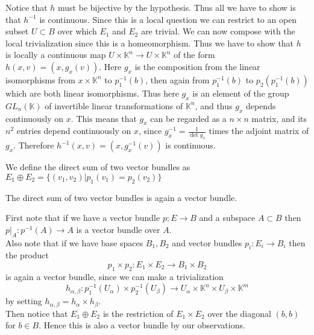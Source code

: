 \documentclass[../Thesis.tex]{subfiles}
\begin{document}
\begin{myproof}
Notice that $h$ must be bijective by the hypothesis. Thus all we have to show is that $h^{-1}$ is continuous. Since this is a local question we can restrict to an open subset $U \subset B$ over which $E_1$ and $E_2$ are trivial. We can now compose with the local trivialization since this is a homeomorphism. Thus we have to show that $h$ is locally a continuous map $U \times \mathbb{K}^n \rightarrow U \times \mathbb{K}^n$ of the form $h(x,v) = (x, g_x(v))$. Here $g_x$ is the composition from the linear isomorphisms from $x \times \mathbb{K}^n$ to $p_1^{-1}(b)$, then again from $p_1^{-1}(b)$ to $p_2(p_1^{-1}(b))$ which are both linear isomorphisms. Thus here $g_x$ is an element of the group $GL_n(\mathbb{K})$ of invertible linear transformations of $\mathbb{K}^n$, and thus $g_x$ depends continuously on $x$. This means that $g_x$ can be regarded as a $n \times n$ matrix, and its $n^2$ entries depend continuously on $x$, since $g_x^{-1} = \frac{1}{\det g_x}$ times the adjoint matrix of $g_x$. Therefore $h^{-1}(x,v) = (x, g_x^{-1}(v))$ is continuous.
\end{myproof}
\begin{mydef}
We define the direct sum of two vector bundles as $E_1 \oplus E_2 = \{ (v_1, v_2)| p_1(v_1) = p_2(v_2)\}$
\end{mydef}
\begin{lemma}
The direct sum of two vector bundles is again a vector bundle.
\end{lemma}
\begin{myproof}
First note that if we have a vector bundle $p: E \rightarrow B$ and a subspace $A \subset B$ then $p|_A : p^ {-1} (A) \rightarrow A$ is a vector bundle over $A$.
\\Also note that if we have base spaces $B_1, B_2$ and vector bundles $p_i : E_i \rightarrow B_i$ then the product
\begin{equation}
p_1 \times p_2 : E_1 \times E_2 \rightarrow B_1 \times B_2
\end{equation} 
is again a vector bundle, since we can make a trivialization \begin{equation}
h_{\alpha, \beta} : p_1^{-1}(U_\alpha) \times p_2^{-1}(U_\beta) \rightarrow U_\alpha \times \mathbb{K}^n \times U_\beta \times \mathbb{K}^m
\end{equation}
 by setting $h_{\alpha, \beta} = h_\alpha \times h_\beta$.
\\Then notice that $E_1 \oplus E_2$ is the restriction of $E_1 \times E_2$ over the diagonal $(b,b)$ for $b \in B$. Hence this is also a vector bundle by our observations.
\end{myproof}
\end{document}
